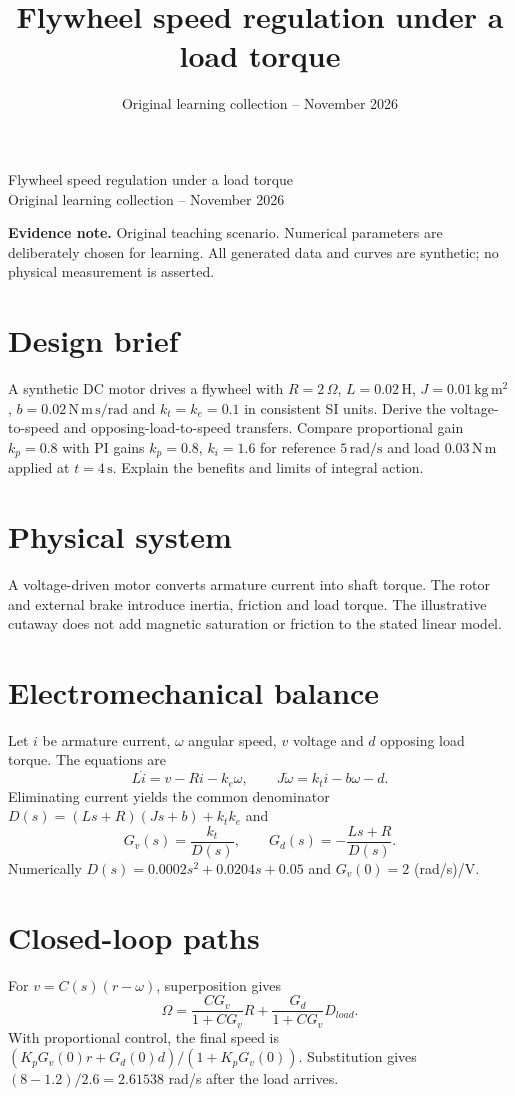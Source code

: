 \documentclass[10pt,a4paper]{article}
\title{\color{ink}Flywheel speed regulation under a load torque}
\author{}
\date{Original learning collection -- November 2026}
\begin{document}
\begin{center}{\LARGE\color{ink}Flywheel speed regulation under a load torque}\\[5pt]{\small Original learning collection -- November 2026}\end{center}

\textbf{Evidence note.} Original teaching scenario. Numerical parameters are deliberately chosen for learning. All generated data and curves are synthetic; no physical measurement is asserted.
\section{Design brief}
A synthetic DC motor drives a flywheel with $R=2\,\Omega$, $L=0.02\,\mathrm{H}$, $J=0.01\,\mathrm{kg\,m^2}$, $b=0.02\,\mathrm{N\,m\,s/rad}$ and $k_t=k_e=0.1$ in consistent SI units. Derive the voltage-to-speed and opposing-load-to-speed transfers. Compare proportional gain $k_p=0.8$ with PI gains $k_p=0.8$, $k_i=1.6$ for reference $5\,\mathrm{rad/s}$ and load $0.03\,\mathrm{N\,m}$ applied at $t=4\,\mathrm{s}$. Explain the benefits and limits of integral action.
\section{Physical system}
\begin{center}\resizebox{.88\linewidth}{!}{}\par{\small A voltage-driven motor converts armature current into shaft torque. The rotor and external brake introduce inertia, friction and load torque. The illustrative cutaway does not add magnetic saturation or friction to the stated linear model.}\end{center}
\section{Electromechanical balance}
Let $i$ be armature current, $\omega$ angular speed, $v$ voltage and $d$ opposing load torque. The equations are
\[L\dot i=v-Ri-k_e\omega,\qquad J\dot\omega=k_t i-b\omega-d.\]
Eliminating current yields the common denominator $D(s)=(Ls+R)(Js+b)+k_tk_e$ and
\[G_v(s)=\frac{k_t}{D(s)},\qquad G_d(s)=-\frac{Ls+R}{D(s)}.\]
Numerically $D(s)=0.0002s^2+0.0204s+0.05$ and $G_v(0)=2$ (rad/s)/V.
\section{Closed-loop paths}
For $v=C(s)(r-\omega)$, superposition gives
\[\Omega=\frac{C G_v}{1+C G_v}R+\frac{G_d}{1+C G_v}D_{load}.\]
With proportional control, the final speed is $(K_pG_v(0)r+G_d(0)d)/(1+K_pG_v(0))$. Substitution gives $(8-1.2)/2.6=2.61538$ rad/s after the load arrives.
\end{document}
